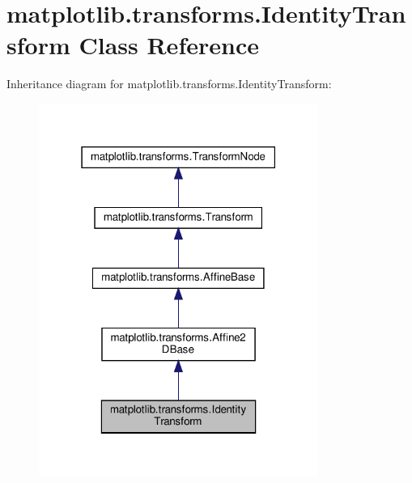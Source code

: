 \hypertarget{classmatplotlib_1_1transforms_1_1IdentityTransform}{}\section{matplotlib.\+transforms.\+Identity\+Transform Class Reference}
\label{classmatplotlib_1_1transforms_1_1IdentityTransform}


Inheritance diagram for matplotlib.\+transforms.\+Identity\+Transform\+:
\nopagebreak
\begin{figure}[H]
\begin{center}
\leavevmode
\includegraphics[width=259pt]{classmatplotlib_1_1transforms_1_1IdentityTransform__inherit__graph}
\end{center}
\end{figure}


